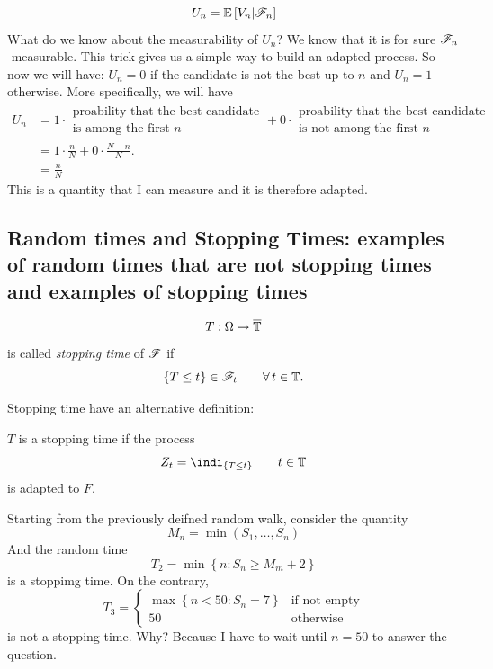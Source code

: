 \documentclass{report}
\begin{document}
\[U_n=\mathbb{E}\left[V_n|\mathscr{F}_n\right]\]
What do we know about the measurability of $U_n$? We know that it is for sure $\mathscr{F}_n$-measurable. This trick gives us a simple way to build an adapted process. So now we will have:
$U_n=
0$ if the candidate is not the best up to $n$ and $U_n=1$ otherwise. More specifically, we will have
\begin{align*}
	U_n&=1\cdot\substack{\text{proability that the best candidate}\\\text{is among the first $n$}}+0\cdot\substack{\text{proability that the best candidate}\\\text{is not among the first $n$}}\\
	&=1\cdot\frac{n}{N}+0\cdot\frac{N-n}{N}.\\
	&=\frac{n}{N}
\end{align*}
This is a quantity that I can measure and it is therefore adapted.
\subsection{Random times and Stopping Times: examples of random times that are not stopping times
and examples of stopping times}
\begin{definition}
	\[T:\Omega\mapsto\overline{\mathbb{T}}
	\]
	is called \emph{stopping time} of $\mathscr{F}$ if
	\[\{T\leq t\}\in\mathscr{F}_t\qquad\forall\, t\in\mathbb{T}.\]
\end{definition}
Stopping time have an alternative definition:
\begin{definition}
	$T$ is a stopping time if the process
	\[Z_t=\indi_{\{T\leq t\}}\qquad t\in\T\]
	is adapted to $F$.
\end{definition}
Starting from the previously deifned random walk, consider the quantity 
\[M_n=\min(S_1,\ldots,S_n)\]
And the random time
\[T_2=\min\left\{n:S_n\geq M_m+2\right\}\]
is a stoppimg time. On the contrary, 
\[T_3=\begin{cases}
	\max\left\{n<50:S_n=7\right\}&\text{if not empty}\\
	50 &\text{otherwise}
\end{cases}\]
is not a stopping time. Why? Because I have to wait until $n=50$ to answer the question. 
\end{document}
